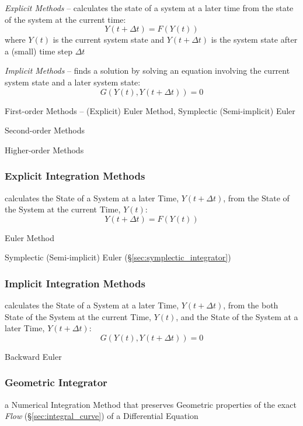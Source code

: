 \emph{Explicit Methods} -- calculates the state of a system at a later time
from the state of the system at the current time:
\[
  Y(t+\Delta{t}) = F(Y(t))
\]
where $Y(t)$ is the current system state and $Y(t + \Delta{t})$ is the system
state after a (small) time step $\Delta{t}$

\emph{Implicit Methods} -- finds a solution by solving an equation involving
the current system state and a later system state:
\[
  G(Y(t), Y(t + \Delta{t})) = 0
\]

First-order Methods -- (Explicit) Euler Method, Symplectic (Semi-implicit) Euler

Second-order Methods

Higher-order Methods



\subsubsection{Explicit Integration Methods}\label{sec:explicit_integration}

calculates the State of a System at a later Time, $Y(t + \Delta{t})$, from the
State of the System at the current Time, $Y(t)$:
\[
  Y(t + \Delta{t}) = F(Y(t))
\]

Euler Method

\fist Symplectic (Semi-implicit) Euler (\S\ref{sec:symplectic_integrator})



\subsubsection{Implicit Integration Methods}\label{sec:implicit_integration}

calculates the State of a System at a later Time, $Y(t + \Delta{t})$, from the
both State of the System at the current Time, $Y(t)$, and the State of the
System at a later Time, $Y(t + \Delta{t})$:
\[
  G(Y(t), Y(t + \Delta{t})) = 0
\]

Backward Euler



\subsubsection{Geometric Integrator}\label{sec:geometric_integrator}

a Numerical Integration Method that preserves Geometric properties of the exact
\emph{Flow} (\S\ref{sec:integral_curve}) of a Differential Equation

